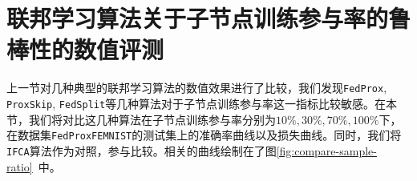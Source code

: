 \section{联邦学习算法关于子节点训练参与率的鲁棒性的数值评测}
\label{sec:chap6-sample}


上一节对几种典型的联邦学习算法的数值效果进行了比较，我们发现\texttt{FedProx}, \texttt{ProxSkip}, \texttt{FedSplit}等几种算法对于子节点训练参与率这一指标比较敏感。在本节，我们将对比这几种算法在子节点训练参与率分别为$10\%, 30\%, 70\%, 100\%$下，在数据集\texttt{FedProxFEMNIST}的测试集上的准确率曲线以及损失曲线。同时，我们将\texttt{IFCA}算法作为对照，参与比较。相关的曲线绘制在了图\ref{fig:compare-sample-ratio}~中。

